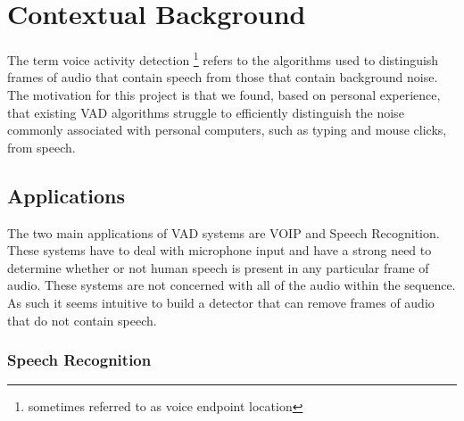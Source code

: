 \documentclass[ %
                    author={Sam Phippen},
                supervisor={Dr. Rafal Bogacz},
                     title={Real time voice activity detectors in noisy personal computing environments},
                  subtitle={},
                    degree={MEng},
                      year={2012} ]{thesis}
\begin{document}

%

\mainmatter


\chapter{Contextual Background}
\label{chap:context}

\vspace{1cm}

The term voice activity detection \footnote{sometimes referred to as voice endpoint
location\cite{Tuske}} refers to the algorithms used to distinguish frames of
audio that contain speech from those that contain background
noise\cite{ramirez}. The motivation for this project is that we found, based on
personal experience, that existing VAD algorithms struggle to efficiently
distinguish the noise commonly associated with personal computers, such as typing and
mouse clicks, from speech.

\section{Applications}

The two main applications of VAD systems are VOIP and Speech Recognition. These
systems have to deal with microphone input and have a strong need to determine
whether or not human speech is present in any particular frame of audio. These
systems are not concerned with all of the audio within the sequence. As such it
seems intuitive to build a detector that can remove frames of audio that do not
contain speech.

\subsection{Speech Recognition}
\end{document}
